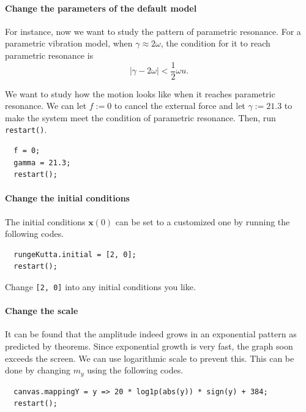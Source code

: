 \documentclass[12pt]{article}
\begin{document}
\paragraph{Change the parameters of the default model}

For instance, now we want to study the pattern of parametric resonance.
For a parametric vibration model, when $\gamma\approx2\omega$,
the condition for it to reach parametric resonance is\footnotemark \cite[p. 82]{landau1976mechanics}
\begin{equation}
  \left|\gamma-2\omega\right|<\frac12\omega u.
\end{equation}


We want to study how the motion looks like when it reaches parametric resonance.
We can let $f:=0$ to cancel the external force
and let $\gamma:=21.3$ to make the system meet the condition of parametric resonance.
Then, run \verb!restart()!.

\begin{verbatim}
  f = 0;
  gamma = 21.3;
  restart();
\end{verbatim}

\paragraph{Change the initial conditions}

The initial conditions $\mathbf x\left(0\right)$ can be set to a customized one
by running the following codes.

\begin{verbatim}
  rungeKutta.initial = [2, 0];
  restart();
\end{verbatim}

Change \verb![2, 0]! into any initial conditions you like.

\paragraph{Change the scale}

It can be found that the amplitude indeed grows in an exponential pattern as predicted by theorems.
Since exponential growth is very fast, the graph soon exceeds the screen.
We can use logarithmic scale to prevent this.
This can be done by changing $m_y$ using the following codes.

\begin{verbatim}
  canvas.mappingY = y => 20 * log1p(abs(y)) * sign(y) + 384;
  restart();
\end{verbatim}
\end{document}
